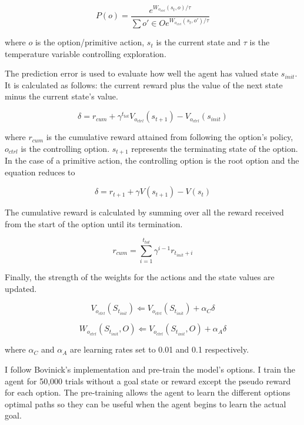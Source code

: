 \begin{equation}P(o) = \frac{ e^{W_{o_{ctrl}}(s_t,o)/\tau}}{\sum{o' \in O} e^{W_{o_{ctrl}}(s_t,o')/\tau}}\end{equation}

where $o$ is the option/primitive action, $s_{t}$ is the current state and $\tau$ is the temperature variable controlling exploration. 

The prediction error is used to evaluate how well the agent has valued state $s_{init}$. It is calculated as follows: the current reward plus the value of the next state minus the current state's value. 

\begin{equation}\delta = r_{cum} + \gamma^{t_{tot}}V_{o_{ctrl}}(s_{t+1}) - V_{o_{ctrl}}(s_{init})\end{equation}

where $r_{cum}$ is the cumulative reward attained from following the option's policy, $o_{ctrl}$ is the controlling option. $s_{t+1}$ represents the terminating state of the option. In the case of a primitive action, the controlling option is the root option and the equation reduces to 

\begin{equation}\delta = r_{t+1} + \gamma V(s_{t+1}) - V(s_{t})\end{equation}

The cumulative reward is calculated by summing over all the reward received from the start of the option until its termination.

\begin{equation}r_{cum} = \sum_{i=1}^{t_{tot}} \gamma^{i-1}r_{t_{init}+i}\end{equation}

Finally, the strength of the weights for the actions and the state values are updated.

\begin{equation}V_{o_{ctrl}}(S_{t_{init}}) \Longleftarrow V_{o_{ctrl}}(S_{t_{init}}) + \alpha_{C}\delta\end{equation}

\begin{equation}W_{o_{ctrl}}(S_{t_{init}},O) \Longleftarrow V_{o_{ctrl}}(S_{t_{init}},O) + \alpha_{A}\delta\end{equation}

where $\alpha_{C}$ and $\alpha_{A}$ are learning rates set to 0.01 and 0.1 respectively.

I follow Bovinick's implementation and pre-train the model's options. I train the agent for 50,000 trials without a goal state or reward except the pseudo reward for each option. The pre-training allows the agent to learn the different options optimal paths so they can be useful when the agent begins to learn the actual goal.

